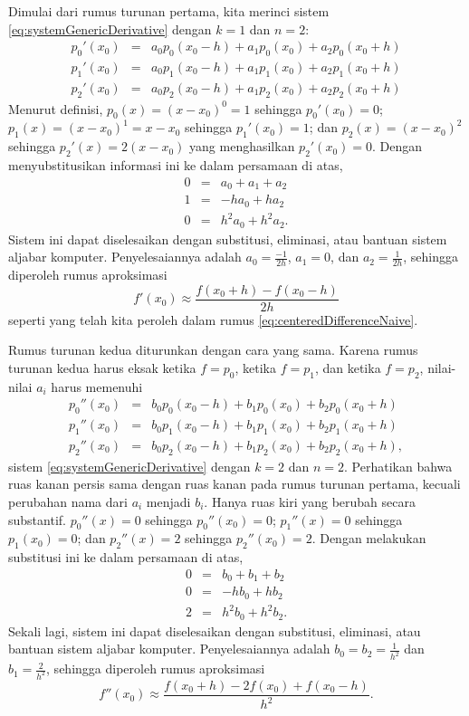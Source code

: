 Dimulai dari rumus turunan pertama, kita merinci sistem \ref{eq:systemGenericDerivative}
dengan $k=1$ dan $n=2$:
\begin{eqnarray*}
p_{0}'(x_{0}) & = & a_{0}p_{0}(x_{0}-h)+a_{1}p_{0}(x_{0})+a_{2}p_{0}(x_{0}+h)\\
p_{1}'(x_{0}) & = & a_{0}p_{1}(x_{0}-h)+a_{1}p_{1}(x_{0})+a_{2}p_{1}(x_{0}+h)\\
p_{2}'(x_{0}) & = & a_{0}p_{2}(x_{0}-h)+a_{1}p_{2}(x_{0})+a_{2}p_{2}(x_{0}+h)
\end{eqnarray*}
Menurut definisi, $p_{0}(x)=(x-x_{0})^{0}=1$ sehingga $p_{0}'(x_{0})=0$;
$p_{1}(x)=(x-x_{0})^{1}=x-x_{0}$ sehingga $p_{1}'(x_{0})=1$; dan
$p_{2}(x)=(x-x_{0})^{2}$ sehingga $p_{2}'(x)=2(x-x_{0})$ yang menghasilkan
$p_{2}'(x_{0})=0$. Dengan menyubstitusikan informasi ini ke dalam
persamaan di atas,
\begin{eqnarray*}
0 & = & a_{0}+a_{1}+a_{2}\\
1 & = & -ha_{0}+ha_{2}\\
0 & = & h^{2}a_{0}+h^{2}a_{2}.
\end{eqnarray*}
Sistem ini dapat diselesaikan dengan substitusi, eliminasi, atau bantuan
sistem aljabar komputer. Penyelesaiannya adalah $a_{0}=\frac{-1}{2h}$,
$a_{1}=0$, dan $a_{2}=\frac{1}{2h}$, sehingga diperoleh rumus aproksimasi
\[
f'(x_{0})\approx\frac{f(x_{0}+h)-f(x_{0}-h)}{2h}
\]
seperti yang telah kita peroleh 
dalam rumus \ref{eq:centeredDifferenceNaive}.

Rumus turunan kedua diturunkan dengan cara yang sama. Karena rumus
turunan kedua harus eksak ketika $f=p_{0}$, ketika $f=p_{1}$, dan
ketika $f=p_{2}$, nilai-nilai $a_{i}$ harus memenuhi
\begin{eqnarray*}
p_{0}''(x_{0}) & = & b_{0}p_{0}(x_{0}-h)+b_{1}p_{0}(x_{0})+b_{2}p_{0}(x_{0}+h)\\
p_{1}''(x_{0}) & = & b_{0}p_{1}(x_{0}-h)+b_{1}p_{1}(x_{0})+b_{2}p_{1}(x_{0}+h)\\
p_{2}''(x_{0}) & = & b_{0}p_{2}(x_{0}-h)+b_{1}p_{2}(x_{0})+b_{2}p_{2}(x_{0}+h),
\end{eqnarray*}
sistem \ref{eq:systemGenericDerivative} dengan $k=2$ dan $n=2$.
Perhatikan bahwa ruas kanan persis sama dengan ruas kanan pada rumus
turunan pertama, kecuali perubahan nama dari $a_{i}$ menjadi $b_{i}$.
Hanya ruas kiri yang berubah secara substantif. $p_{0}''(x)=0$ sehingga
$p_{0}''(x_{0})=0$; $p_{1}''(x)=0$ sehingga $p_{1}(x_{0})=0$; dan
$p_{2}''(x)=2$ sehingga $p_{2}''(x_{0})=2$. Dengan melakukan substitusi
ini ke dalam persamaan di atas,
\begin{eqnarray*}
0 & = & b_{0}+b_{1}+b_{2}\\
0 & = & -hb_{0}+hb_{2}\\
2 & = & h^{2}b_{0}+h^{2}b_{2}.
\end{eqnarray*}
Sekali lagi, sistem ini dapat diselesaikan dengan substitusi, eliminasi,
atau bantuan sistem aljabar komputer. Penyelesaiannya adalah $b_{0}=b_{2}=\frac{1}{h^{2}}$
dan $b_{1}=\frac{2}{h^{2}}$, sehingga diperoleh rumus aproksimasi
\[
f''(x_{0})\approx\frac{f(x_{0}+h)-2f(x_{0})+f(x_{0}-h)}{h^{2}}.
\]


